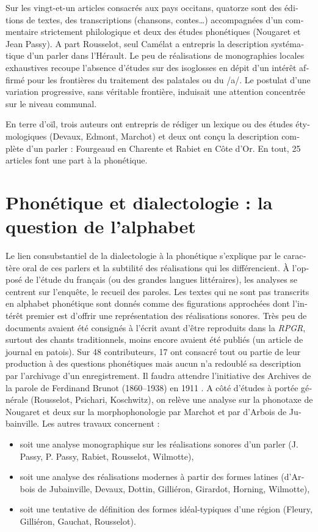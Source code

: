 \documentclass[french,output=paper,colorlinks,citecolor=brown]{../langscibook}
\begin{document}
\begin{otherlanguage}{french}
Sur les vingt-et-un articles consacrés aux pays occitans, quatorze sont des éditions de textes, des transcriptions (chansons, contes…) accompagnées d’un commentaire strictement philologique et deux des études phonétiques (Nougaret et Jean Passy). A part Rousselot, seul Camélat a entrepris la description systématique d’un parler dans l’Hérault. Le peu de réalisations de monographies locales exhaustives recoupe l’absence d’études sur des isoglosses en dépit d’un intérêt affirmé pour les frontières du traitement des palatales ou du /a/. Le postulat d’une variation progressive, sans véritable frontière, induisait une attention concentrée sur le niveau communal. 

En terre d’oïl, trois auteurs ont entrepris de rédiger un lexique ou des études étymologiques (Devaux, Edmont, Marchot) et deux ont conçu la description complète d’un parler : Fourgeaud en Charente et Rabiet en Côte d’Or. En tout, 25 articles font une part à la phonétique.

\section{Phonétique et dialectologie : la question de l’alphabet}

Le lien consubstantiel de la dialectologie à la phonétique s’explique par le caractère oral de ces parlers et la subtilité des réalisations qui les différencient. À l’opposé de l’étude du français (ou des grandes langues littéraires), les analyses se centrent sur l’enquête, le recueil des paroles. Les textes qui ne sont pas transcrits en alphabet phonétique sont donnés comme des figurations approchées dont l’intérêt premier est d’offrir une représentation des réalisations sonores. Très peu de documents avaient été consignés à l’écrit avant d’être reproduits dans la \textit{RPGR}, surtout des chants traditionnels, moins encore avaient été publiés (un article de journal en patois). Sur 48 contributeurs, 17 ont consacré tout ou partie de leur production à des questions phonétiques mais aucun n’a redoublé sa description par l’archivage d’un enregistrement. Il faudra attendre l’initiative des Archives de la parole de Ferdinand Brunot (1860--1938) en 1911 \citep{Cordereix2001}. A côté d’études à portée générale (Rousselot, Psichari, Koschwitz), on relève une analyse sur la phonotaxe de Nougaret et deux sur la morphophonologie par Marchot et par d’Arbois de Jubainville. Les autres travaux concernent :

\begin{itemize}
    \item  soit une analyse monographique sur les réalisations sonores d’un parler (J. Passy, P. Passy, Rabiet, Rousselot, Wilmotte), 
    \item  soit une analyse des réalisations modernes à partir des formes latines (d’Arbois de Jubainville, Devaux, Dottin, Gilliéron, Girardot, Horning, Wilmotte), 
    \item  soit une tentative de définition des formes idéal-typiques d’une région (Fleury, Gilliéron, Gauchat, Rousselot).
\end{itemize}


\end{otherlanguage}
\end{document}
